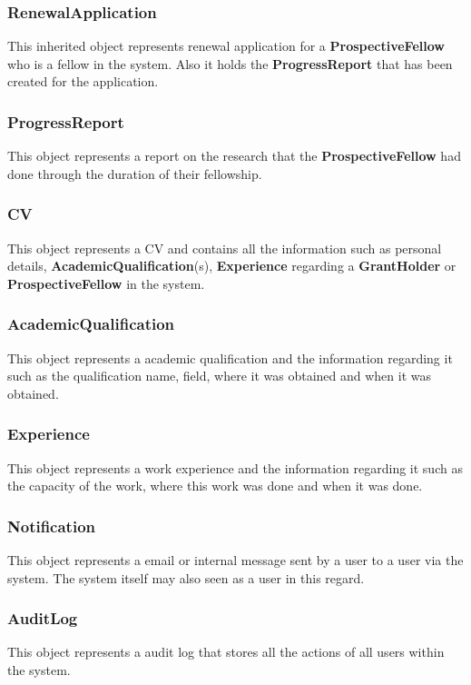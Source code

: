 \documentclass[12pt]{article}
\begin{document}
\subsubsection{RenewalApplication}
This inherited object represents renewal application for a \textbf{ProspectiveFellow} who is a fellow in the system. Also it holds the \textbf{ProgressReport} that has been created for the application.

\subsubsection{ProgressReport}
This object represents a report on the research that the \textbf{ProspectiveFellow} had done through the duration of their fellowship.

\subsubsection{CV}
This object represents a CV and contains all the information such as personal details, \textbf{AcademicQualification}(s), \textbf{Experience} regarding a \textbf{GrantHolder} or \textbf{ProspectiveFellow} in the system.

\subsubsection{AcademicQualification}
This object represents a academic qualification and the information regarding it such as the qualification name, field, where it was obtained and when it was obtained.

\subsubsection{Experience}
This object represents a work experience and the information regarding it such as the capacity of the work, where this work was done and when it was done.

\subsubsection{Notification}
This object represents a email or internal message sent by a user to a user via the system. The system itself may also seen as a user in this regard.

\subsubsection{AuditLog}
This object represents a audit log that stores all the actions of all users within the system.
\end{document}
